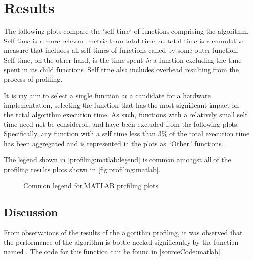 \section{Results}
\label{profiling:matlab:results}
The following plots compare the `self time' of functions comprising the
 algorithm. Self time is a more
relevant metric than total time, as total time is a cumulative measure that
includes all self times of functions called by some outer function. Self time,
on the other hand, is the time spent \emph{in} a function excluding the time
spent in its child functions. Self time also includes overhead resulting from
the process of profiling.

It is my aim to select a single function as a candidate for a hardware
implementation, selecting the function that has the most significant impact on
the total algorithm execution time. As such, functions with a relatively small
self time need not be considered, and have been excluded from the following
plots. Specifically, any function with a self time less than 3\% of the total
execution time has been aggregated and is represented in the plots as ``Other''
functions.

The legend shown in \autoref{profiling:matlab:legend} is common amongst all of
the  profiling results plots shown in
\autoref{fig:profiling:matlab}.

\begin{figure}
    \centering
    
    \caption{Common legend for MATLAB profiling plots}
    \label{profiling:matlab:legend}
\end{figure}


\subsection{Discussion}
\label{profiling:matlab:discussion}
From observations of the results of the algorithm profiling, it was observed
that the performance of the 
algorithm is bottle-necked significantly by the function named
. The  code for this
function can be found in \autoref{sourceCode:matlab}.

